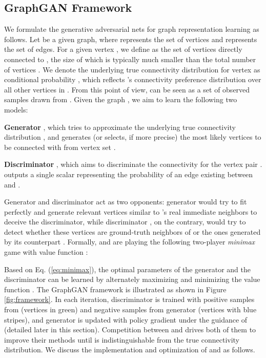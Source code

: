 \documentclass[letterpaper]{article}
\begin{document}
	\subsection{GraphGAN Framework}
		We formulate the generative adversarial nets for graph representation learning as follows.
		Let  be a given graph, where  represents the set of vertices and  represents the set of edges.
		For a given vertex , we define  as the set of vertices directly connected to , the size of which is typically much smaller than the total number of vertices .
		We denote the underlying true connectivity distribution for vertex  as conditional probability , which reflects 's connectivity preference distribution over all other vertices in .
		From this point of view,  can be seen as a set of observed samples drawn from .
		Given the graph , we aim to learn the following two models:
	
		\textbf{Generator }, which tries to approximate the underlying true connectivity distribution , and generates (or selects, if more precise) the most likely vertices to be connected with  from vertex set .
	
		\textbf{Discriminator }, which aims to discriminate the connectivity for the vertex pair .
		 outputs a single scalar representing the probability of an edge existing between  and .
	
		Generator  and discriminator  act as two opponents: generator  would try to fit  perfectly and generate relevant vertices similar to 's real immediate neighbors to deceive the discriminator, while discriminator , on the contrary, would try to detect whether these vertices are ground-truth neighbors of  or the ones generated by its counterpart .
		Formally,  and  are playing the following two-player \textit{minimax} game with value function :
		
	
		Based on Eq. (\ref{eq:minimax}), the optimal parameters of the generator and the discriminator can be learned by alternately maximizing and minimizing the value function .
		The GraphGAN framework is illustrated as shown in Figure \ref{fig:framework}.
		In each iteration, discriminator  is trained with positive samples from  (vertices in green) and negative samples from generator  (vertices with blue stripes), and generator  is updated with policy gradient under the guidance of  (detailed later in this section).
		Competition between  and  drives both of them to improve their methods until  is indistinguishable from the true connectivity distribution.
		We discuss the implementation and optimization of  and  as follows.
	
\end{document}
